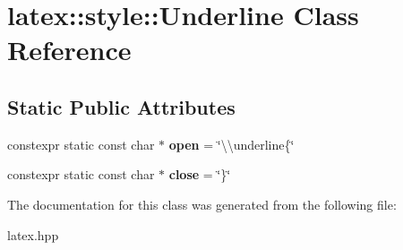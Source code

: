 \hypertarget{classlatex_1_1style_1_1Underline}{\section{latex\-:\-:style\-:\-:Underline Class Reference}
\label{classlatex_1_1style_1_1Underline}
}
\subsection*{Static Public Attributes}
\begin{DoxyCompactItemize}
\item 
\hypertarget{classlatex_1_1style_1_1Underline_a3bcc726be4c113118db71914a5ca03fa}{constexpr static const char $\ast$ {\bfseries open} = \char`\"{}\textbackslash{}\textbackslash{}underline\{\char`\"{}}\label{classlatex_1_1style_1_1Underline_a3bcc726be4c113118db71914a5ca03fa}

\item 
\hypertarget{classlatex_1_1style_1_1Underline_a6ce3892d15bca28afb88f7addcde75fe}{constexpr static const char $\ast$ {\bfseries close} = \char`\"{}\}\char`\"{}}\label{classlatex_1_1style_1_1Underline_a6ce3892d15bca28afb88f7addcde75fe}

\end{DoxyCompactItemize}


The documentation for this class was generated from the following file\-:\begin{DoxyCompactItemize}
\item 
latex.\-hpp\end{DoxyCompactItemize}
